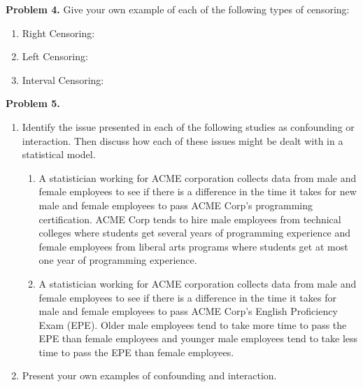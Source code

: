 \documentclass[12pt]{article}
\begin{document}
\textbf{Problem 4.}
Give your own example of each of the following types of censoring:
\begin{enumerate}
\item Right Censoring:
\item Left Censoring:
\item Interval Censoring:
\end{enumerate}
\newpage
\textbf{Problem 5.}
\begin{enumerate}
\item
Identify the issue presented in each of the following studies as confounding or interaction. Then discuss how each of these issues might be dealt with in a statistical model.
\begin{enumerate}
\item A statistician working for ACME corporation collects data from male and female employees to see if there is a difference in the time it takes for new male and female employees to pass ACME Corp's programming certification. ACME Corp tends to hire male employees from technical colleges where students get several years of programming experience and female employees from liberal arts programs where students get at most one year of programming experience.
\item  A statistician working for ACME corporation collects data from male and female employees to see if there is a difference in the time it takes for male and female employees to pass ACME Corp's English Proficiency Exam (EPE). Older male employees tend to take more time to pass the EPE than female employees and younger male employees tend to take less time to pass the EPE than female employees.
\end{enumerate}
\item Present your own examples of confounding and interaction.
\end{enumerate}
\end{document}

